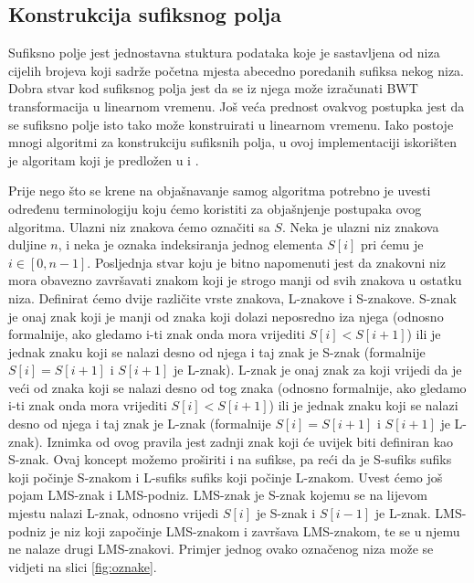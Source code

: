 \subsection{Konstrukcija sufiksnog polja}
Sufiksno polje jest jednostavna stuktura podataka koje je sastavljena od niza cijelih brojeva koji sadrže početna mjesta abecedno poredanih sufiksa nekog niza. Dobra stvar kod sufiksnog polja jest da se iz njega može izračunati BWT transformacija u linearnom vremenu. Još veća prednost ovakvog postupka jest da se sufiksno polje isto tako može konstruirati u linearnom vremenu. Iako postoje mnogi algoritmi za konstrukciju sufiksnih polja, u ovoj implementaciji iskorišten je algoritam koji je predložen u \cite{sais1} i \cite{sais2}. 

Prije nego što se krene na objašnavanje samog algoritma potrebno je uvesti određenu terminologiju koju ćemo koristiti za objašnjenje postupaka ovog algoritma. Ulazni niz znakova ćemo označiti sa $S$. Neka je ulazni niz znakova duljine $n$, i neka je oznaka indeksiranja jednog elementa $S[i]$ pri ćemu je $i \in [0,n-1]$. Posljednja stvar koju je bitno napomenuti jest da znakovni niz mora obavezno završavati znakom koji je strogo manji od svih znakova u ostatku niza.  Definirat ćemo dvije različite vrste znakova, L-znakove i S-znakove. S-znak je onaj znak koji je manji od znaka koji dolazi neposredno iza njega (odnosno formalnije, ako gledamo i-ti znak onda mora vrijediti $S[i]<S[i+1]$) ili je jednak znaku koji se nalazi desno od njega i taj znak je S-znak (formalnije $S[i]=S[i+1]$ i $S[i+1]$ je L-znak). L-znak je onaj znak za koji vrijedi da je veći od znaka koji se nalazi desno od tog znaka (odnosno formalnije, ako gledamo i-ti znak onda mora vrijediti $S[i]<S[i+1]$) ili je jednak znaku koji se nalazi desno od njega i taj znak je L-znak (formalnije $S[i]=S[i+1]$ i $S[i+1]$ je L-znak). Iznimka od ovog pravila jest zadnji znak koji će uvijek biti definiran kao S-znak. Ovaj koncept možemo proširiti i na sufikse, pa reći da je S-sufiks sufiks koji počinje S-znakom i L-sufiks sufiks koji počinje L-znakom. Uvest ćemo još pojam LMS-znak i LMS-podniz. LMS-znak je S-znak kojemu se na lijevom mjestu nalazi L-znak, odnosno vrijedi $S[i]$ je S-znak i $S[i-1]$ je L-znak. LMS-podniz je niz koji započinje LMS-znakom i završava LMS-znakom, te se u njemu ne nalaze drugi LMS-znakovi. Primjer jednog ovako označenog niza može se vidjeti na slici \ref{fig:oznake}.

\\

